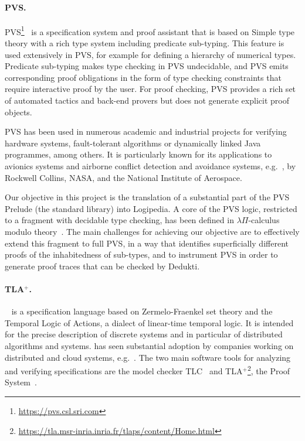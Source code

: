 \paragraph*{PVS.}
PVS\footnote{\url{https://pvs.csl.sri.com}}~\cite{owre:pvs} is a specification
system and proof assistant that is based on Simple type theory with a rich type
system including predicate sub-typing. This feature is used extensively in PVS,
for example for defining a hierarchy of numerical types. Predicate sub-typing
makes type checking in PVS undecidable, and PVS emits corresponding proof
obligations in the form of type checking constraints that require
interactive proof by the user. For proof checking, PVS provides a rich set of
automated tactics and back-end provers but does not generate explicit proof
objects.

PVS has been used in numerous academic and industrial projects for
verifying hardware systems, fault-tolerant algorithms or dynamically
linked Java programmes, among others. It is particularly known for its
applications to avionics systems and airborne conflict detection and
avoidance systems, e.g.\ \cite{munoz:unmanned}, by Rockwell Collins,
NASA, and the National Institute of Aerospace.

Our objective in this project is the translation of a substantial part of the
PVS Prelude (the standard library) into Logipedia. A core of the PVS logic,
restricted to a fragment with decidable type checking, has been defined in
$\lambda\Pi$-calculus modulo theory~\cite{gilbert:extending}. The main
challenges for achieving our objective are to effectively extend this fragment
to full PVS, in a way that identifies superficially different proofs of the
inhabitedness of sub-types, and to instrument PVS in order to generate proof
traces that can be checked by Dedukti.

\paragraph*{TLA$^+$.}
\tlaplus~\cite{lamport:specifying} is a specification language based on
Zermelo-Fraenkel set theory and the Temporal Logic of Actions, a dialect of
linear-time temporal logic. It is intended for the precise description of
discrete systems and in particular of distributed algorithms and systems.
\tlaplus has seen substantial adoption by companies working on distributed and
cloud systems, e.g.~\cite{newcombe:amazon-cacm}. The two main software tools for
analyzing and verifying \tlaplus specifications are the model checker
TLC~\cite{yu:model-checking} and
TLA$^+$\footnote{\url{https://tla.msr-inria.inria.fr/tlaps/content/Home.html}},
the \tlaplus Proof System~\cite{cousineau:tla-proofs}.

